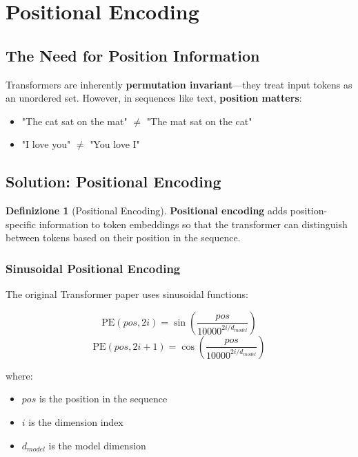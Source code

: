 \documentclass[11pt,a4paper]{article}
\theoremstyle{definition}
\newtheorem{definition}{Definizione}[section]
\theoremstyle{plain}
\theoremstyle{remark}
\begin{document}
\section{Positional Encoding}

\subsection{The Need for Position Information}

\begin{tcolorbox}[colback=orange!10!white,colframe=orange!75!black,title=\textbf{Problem: Permutation Invariance}]
Transformers are inherently \textbf{permutation invariant}—they treat input tokens as an unordered set. However, in sequences like text, \textbf{position matters}:

\begin{itemize}
    \item "The cat sat on the mat" $\neq$ "The mat sat on the cat"
    \item "I love you" $\neq$ "You love I"
\end{itemize}
\end{tcolorbox}

\subsection{Solution: Positional Encoding}

\begin{definition}[Positional Encoding]
\textbf{Positional encoding} adds position-specific information to token embeddings so that the transformer can distinguish between tokens based on their position in the sequence.
\end{definition}

\subsubsection{Sinusoidal Positional Encoding}

The original Transformer paper uses sinusoidal functions:

\[
\text{PE}(pos, 2i) = \sin\left(\frac{pos}{10000^{2i/d_{model}}}\right)
\]
\[
\text{PE}(pos, 2i+1) = \cos\left(\frac{pos}{10000^{2i/d_{model}}}\right)
\]

where:
\begin{itemize}
    \item $pos$ is the position in the sequence
    \item $i$ is the dimension index
    \item $d_{model}$ is the model dimension
\end{itemize}
\end{document}

